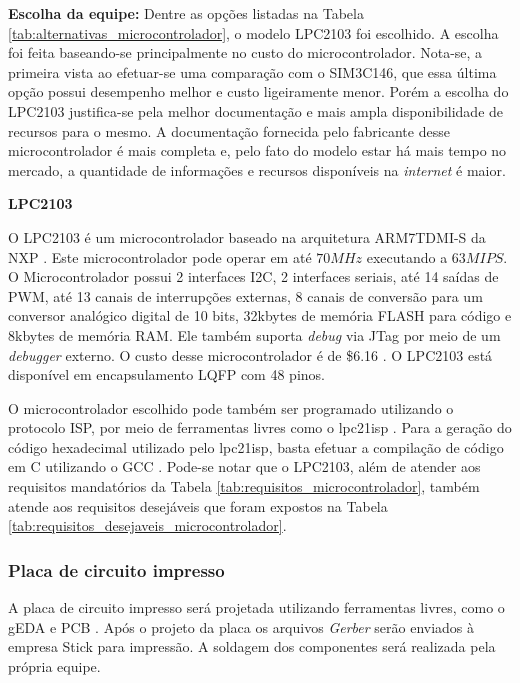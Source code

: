 \textbf{Escolha da equipe:} Dentre as opções listadas na Tabela \ref{tab:alternativas_microcontrolador}, o modelo LPC2103 foi escolhido. A escolha foi feita baseando-se principalmente no custo do microcontrolador. Nota-se, a primeira vista ao efetuar-se uma comparação com o SIM3C146, que essa última opção possui desempenho melhor e custo ligeiramente menor. Porém a escolha do LPC2103 justifica-se pela melhor documentação e mais ampla disponibilidade de recursos para o mesmo. A documentação fornecida pelo fabricante desse microcontrolador é mais completa e, pelo fato do modelo estar há mais tempo no mercado, a quantidade de informações e recursos disponíveis na \textit{internet} é maior.

\textbf{LPC2103}

O LPC2103 é um microcontrolador baseado na arquitetura ARM7TDMI-S da NXP \cite{lpc2103}. Este microcontrolador pode operar em até $ 70MHz $ executando a $ 63MIPS $. O Microcontrolador possui 2 interfaces I2C, 2 interfaces seriais, até 14 saídas de PWM, até 13 canais de interrupções externas, 8 canais de conversão para um conversor analógico digital de 10 bits, 32kbytes de memória FLASH para código e 8kbytes de memória RAM. Ele também suporta \textit{debug} via JTag por meio de um \textit{debugger} externo. O custo desse microcontrolador é de \$6.16 \cite{digikey}. O LPC2103 está disponível em encapsulamento LQFP com 48 pinos.

O microcontrolador escolhido pode também ser programado utilizando o protocolo ISP, por meio de ferramentas livres como o lpc21isp \cite{lpc21isp}. Para a geração do código hexadecimal utilizado pelo lpc21isp, basta efetuar a compilação de código em C utilizando o GCC \cite{gcc}.
Pode-se notar que o LPC2103, além de atender aos requisitos mandatórios da Tabela \ref{tab:requisitos_microcontrolador}, também atende aos requisitos desejáveis que foram expostos na Tabela \ref{tab:requisitos_desejaveis_microcontrolador}.

\subsubsection{Placa de circuito impresso}

A placa de circuito impresso será projetada utilizando ferramentas livres, como o gEDA \cite{geda} e PCB \cite{pcb}. Após o projeto da placa os arquivos \textit{Gerber} serão enviados à empresa Stick \cite{stick} para impressão. A soldagem dos componentes será realizada pela própria equipe.

